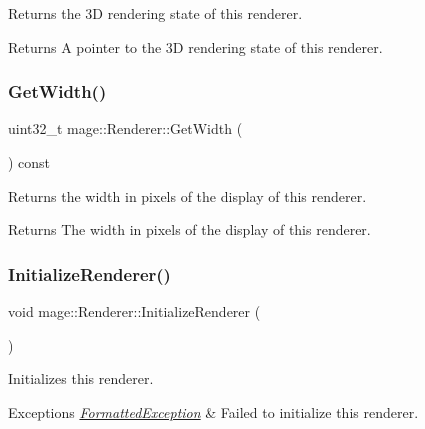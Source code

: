 Returns the 3D rendering state of this renderer.

\begin{DoxyReturn}{Returns}
A pointer to the 3D rendering state of this renderer. 
\end{DoxyReturn}
\hypertarget{classmage_1_1_renderer_a140938e7d5f576163d39ce249ebda99f}{}\label{classmage_1_1_renderer_a140938e7d5f576163d39ce249ebda99f} 
\subsubsection{\texorpdfstring{Get\+Width()}{GetWidth()}}
{\footnotesize\ttfamily uint32\+\_\+t mage\+::\+Renderer\+::\+Get\+Width (\begin{DoxyParamCaption}{ }\end{DoxyParamCaption}) const\hspace{0.3cm}{\ttfamily [noexcept]}}

Returns the width in pixels of the display of this renderer.

\begin{DoxyReturn}{Returns}
The width in pixels of the display of this renderer. 
\end{DoxyReturn}
\hypertarget{classmage_1_1_renderer_a2bb7f4e41ef6db047ce3023ed4e5d0c1}{}\label{classmage_1_1_renderer_a2bb7f4e41ef6db047ce3023ed4e5d0c1} 
\subsubsection{\texorpdfstring{Initialize\+Renderer()}{InitializeRenderer()}}
{\footnotesize\ttfamily void mage\+::\+Renderer\+::\+Initialize\+Renderer (\begin{DoxyParamCaption}{ }\end{DoxyParamCaption})\hspace{0.3cm}{\ttfamily [private]}}

Initializes this renderer.


\begin{DoxyExceptions}{Exceptions}
{\em \hyperlink{structmage_1_1_formatted_exception}{Formatted\+Exception}} & Failed to initialize this renderer. \\
\hline
\end{DoxyExceptions}
\hypertarget{classmage_1_1_renderer_a5ae3220e19c68f47a8e4d55e3ced4694}{}\label{classmage_1_1_renderer_a5ae3220e19c68f47a8e4d55e3ced4694} 
